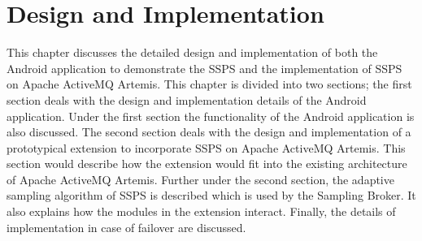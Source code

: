 \chapter{Design and Implementation}\label{chapter:design_implementation}

This chapter discusses the detailed design and implementation of both the Android application to demonstrate the SSPS and the implementation of SSPS on Apache ActiveMQ Artemis. This chapter is divided into two sections; the first section deals with the design and implementation details of the Android application. Under the first section the functionality of the Android application is also discussed. The second section deals with the design and implementation of a prototypical extension to incorporate SSPS on Apache ActiveMQ Artemis. This section would describe how the extension would fit into the existing architecture of Apache ActiveMQ Artemis. Further under the second section, the adaptive sampling algorithm of SSPS is described which is used by the Sampling Broker. It also explains how the modules in the extension interact. Finally, the details of implementation in case of failover are discussed.